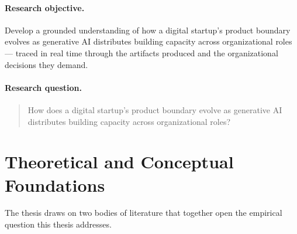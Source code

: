 \documentclass[11pt,a4paper]{article}
\begin{document}

\paragraph{Research objective.} Develop a grounded understanding of how a digital startup's product boundary evolves as generative AI distributes building capacity across organizational roles --- traced in real time through the artifacts produced and the organizational decisions they demand.

\paragraph{Research question.}
\begin{quote}
How does a digital startup's product boundary evolve as generative AI distributes building capacity across organizational roles?
\end{quote}

\section{Theoretical and Conceptual Foundations}


The thesis draws on two bodies of literature that together open the empirical question this thesis addresses.
\end{document}
